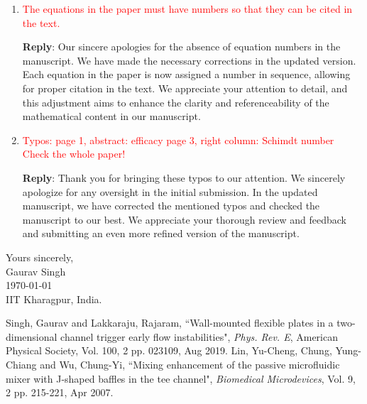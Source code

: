 \documentclass[onecolumn,a4paper,amsmath,amssym,pre]{revtex4}
\begin{document}
\begin{enumerate}
					\item \textcolor{red}{The equations in the paper must have numbers so that they can be cited in the text.}
					
					\textbf{Reply}: Our sincere apologies for the absence of equation numbers in the manuscript. We have made the necessary corrections in the updated version. Each equation in the paper is now assigned a number in sequence, allowing for proper citation in the text. We appreciate your attention to detail, and this adjustment aims to enhance the clarity and referenceability of the mathematical content in our manuscript.
					
					
					\item \textcolor{red}{Typos:
						page 1, abstract: efficacy
						page 3, right column: Schimdt number
						Check the whole paper!}
					
					\textbf{Reply}: Thank you for bringing these typos to our attention. We sincerely apologize for any oversight in the initial submission. In the updated manuscript, we have corrected the mentioned typos and checked the manuscript to our best. We appreciate your thorough review and feedback and submitting an even more refined version of the manuscript. 
				\end{enumerate} 
				
				\vspace{1cm} 
				Yours sincerely,\\
				\vspace{0.1cm}
				Gaurav Singh \\
				\today \\
				IIT Kharagpur, India.
				
				\begin{thebibliography}{100} %
					 Singh, Gaurav and Lakkaraju, Rajaram, ``Wall-mounted flexible plates in a two-dimensional channel trigger early flow instabilities", \emph{Phys. Rev. E}, American Physical Society, Vol. 100, 2 pp. 023109, Aug 2019.
					 Lin, Yu-Cheng, Chung, Yung-Chiang and Wu, Chung-Yi, ``Mixing enhancement of the passive microfluidic mixer with J-shaped baffles in the tee channel", \emph{Biomedical Microdevices}, Vol. 9, 2 pp. 215-221, Apr 2007.
				\end{thebibliography}
				
			
\end{document}
